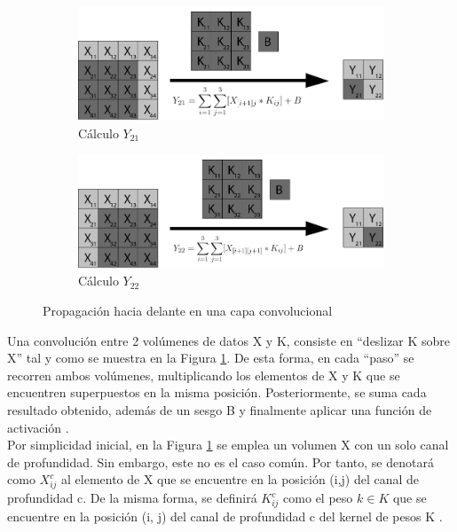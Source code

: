 \begin{figure}[H]
	\vspace{5mm}
	\begin{subfigure}{.5\textwidth}
		\hspace{-10mm}
		\includegraphics[width=1.2\linewidth]{imagenes/conv_3.jpg}  
		\caption{Cálculo $Y_{21}$}
	\end{subfigure}%
	\begin{subfigure}{.5\textwidth}
		\hspace{10mm}
		\includegraphics[width=1.2\linewidth]{imagenes/conv_4.jpg}  
		\caption{Cálculo $Y_{22}$}
	\end{subfigure}
	\caption{Propagación hacia delante en una capa convolucional}
	\label{fig:forward_prop_convolucional}
\end{figure}

Una convolución entre 2 volúmenes de datos X y K, consiste en ``deslizar K sobre X'' tal y como se muestra en la Figura \ref{fig:forward_prop_convolucional}. 
De esta forma, en cada ``paso'' se recorren ambos volúmenes, multiplicando los elementos de X y K que se encuentren superpuestos en la misma posición. Posteriormente, se suma cada resultado obtenido, además de un sesgo B y finalmente aplicar una función de activación \cite{capa_convolucional}. \\
Por simplicidad inicial, en la Figura \ref{fig:forward_prop_convolucional} se emplea un volumen X con un solo canal de profundidad. Sin embargo, este no es el caso común. Por tanto, se denotará como $X^{c}_{ij}$ al elemento de X que se encuentre en la posición (i,j) del canal de profundidad c. De la misma forma, se definirá $K^{c}_{ij}$ como el peso $k \in K$ que se encuentre en la posición (i, j) del canal de profundidad c del kernel de pesos K \cite{capa_convolucional_Stanford}.


